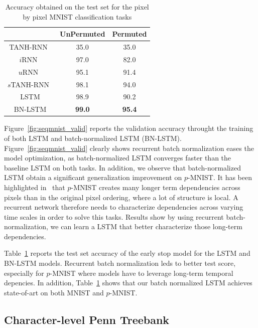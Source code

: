 \documentclass{article} %
\begin{document}
\begin{table}
\center
\small
\begin{tabular}{c|c|c}
  & UnPermuted & Permuted\\
  \hline
  TANH-RNN~\cite{le2015simple} & 35.0 & 35.0\\
  $i$RNN~\cite{le2015simple} & 97.0 & 82.0\\
  $u$RNN~\cite{urnn} & 95.1 & 91.4\\
  $s$TANH-RNN~\cite{zhang2016architectural} & 98.1 & 94.0\\
  \hline
  LSTM & 98.9 & 90.2\\
  BN-LSTM & \textbf{99.0} & \textbf{95.4}\\
\end{tabular}
\caption{Accuracy obtained on the test set for the pixel by pixel MNIST classification tasks}
\label{tab:seqmnist_test}

\end{table}



Figure~\ref{fig:seqmnist_valid} reports the validation accuracy throught the training of both LSTM and batch-normalized LSTM (BN-LSTM). Figure~\ref{fig:seqmnist_valid} clearly shows recurrent batch normalization eases the model optimization, as batch-normalized LSTM converges faster than the baseline LSTM on both tasks.
In addition, we observe that batch-normalized LSTM obtain a significant generalization improvement on $p$-MNIST. It has been highlighted in~\cite{urnn}
that $p$-MNIST creates many longer term dependencies across pixels than in
the original pixel ordering, where a lot of structure is local. A recurrent network therefore needs to characterize dependencies across varying time scales in order to solve this tasks. Results show by using recurrent batch-normalization, we can learn a LSTM that better characterize those long-term dependencies.



Table~\ref{tab:seqmnist_test} reports the test set accuracy of the early stop model for the LSTM and BN-LSTM models. Recurrent batch normalization leds to better test score, especially for $p$-MNIST  where models have to leverage long-term temporal depencies. In addition, Table~\ref{tab:seqmnist_test} shows that our batch normalized LSTM achieves state-of-art on both MNIST and $p$-MNIST.

\subsection{Character-level Penn Treebank}
\end{document}
